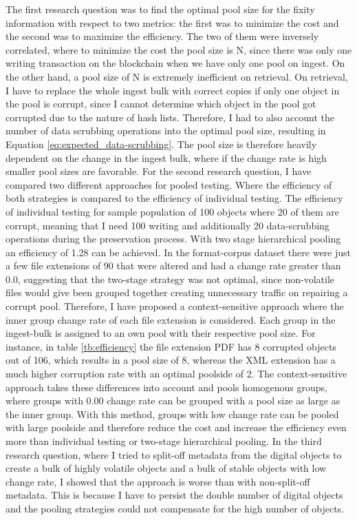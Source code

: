 The first research question was to find the optimal pool size for the fixity information with respect to two metrics: the first was to minimize the cost and the second was to maximize the efficiency. The two of them were inversely correlated, where to minimize the cost the pool size is N, since there was only one writing transaction on the blockchain when we have only one pool on ingest. On the other hand, a pool size of N is extremely inefficient on retrieval. On retrieval, I have to replace the whole ingest bulk with correct copies if only one object in the pool is corrupt, since I cannot determine which object in the pool got corrupted due to the nature of hash lists. Therefore, I had to also account the number of data scrubbing operations into the optimal pool size, resulting in Equation \ref{eq:expected_data-scrubbing}. The pool size is therefore heavily dependent on the change in the ingest bulk, where if the change rate is high smaller pool sizes are favorable.
For the second research question, I have compared two different approaches for pooled testing. Where the efficiency of both strategies is compared to the efficiency of individual testing. The efficiency of individual testing for sample population of 100 objects where 20 of them are corrupt, meaning that I need 100 writing and additionally 20 data-scrubbing operations during the preservation process. With two stage hierarchical pooling an efficiency of 1.28 can be achieved. In the format-corpus dataset there were just a few file extensions of 90 that were altered and had a change rate greater than 0.0, suggesting that the two-stage strategy was not optimal, since non-volatile files would give been grouped together creating unnecessary traffic on repairing a corrupt pool. Therefore, I have proposed a context-sensitive approach where the inner group change rate of each file extension is considered. Each group in the ingest-bulk is assigned to an own pool with their respective pool size. For instance, in table \ref{tb:efficiency} the file extension PDF has 8 corrupted objects out of 106, which results in a pool size of 8, whereas the XML extension has a much higher corruption rate with an optimal poolside of 2. The context-sensitive approach takes these differences into account and pools homogenous groups, where groups with 0.00 change rate can be grouped with a pool size as large as the inner group. With this method, groups with low change rate can be pooled with large poolside and therefore reduce the cost and increase the efficiency even more than individual testing or two-stage hierarchical pooling.
In the third research question, where I tried to split-off metadata from the digital objects to create a bulk of highly volatile objects and a bulk of stable objects with low change rate, I showed that the approach is worse than with non-split-off metadata. This is because I have to persist the double number of digital objects and the pooling strategies could not compensate for the high number of objects.


